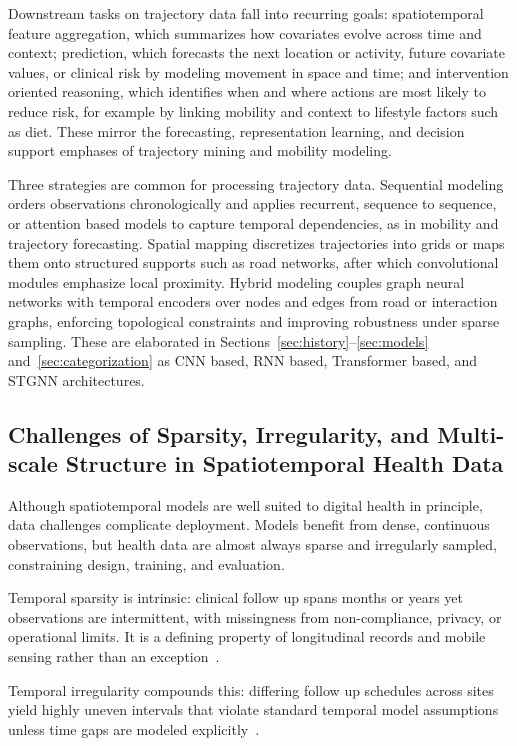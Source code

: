 \documentclass[journal]{IEEEtran}
\begin{document}
Downstream tasks on trajectory data fall into recurring goals: spatiotemporal feature aggregation, which summarizes how covariates evolve across time and context; prediction, which forecasts the next location or activity, future covariate values, or clinical risk by modeling movement in space and time; and intervention oriented reasoning, which identifies when and where actions are most likely to reduce risk, for example by linking mobility and context to lifestyle factors such as diet. These mirror the forecasting, representation learning, and decision support emphases of trajectory mining and mobility modeling.

Three strategies are common for processing trajectory data. Sequential modeling orders observations chronologically and applies recurrent, sequence to sequence, or attention based models to capture temporal dependencies, as in mobility and trajectory forecasting. Spatial mapping discretizes trajectories into grids or maps them onto structured supports such as road networks, after which convolutional modules emphasize local proximity. Hybrid modeling couples graph neural networks with temporal encoders over nodes and edges from road or interaction graphs, enforcing topological constraints and improving robustness under sparse sampling. These are elaborated in Sections~\ref{sec:history}--\ref{sec:models} and~\ref{sec:categorization} as CNN based, RNN based, Transformer based, and STGNN architectures.

\subsection{Challenges of Sparsity, Irregularity, and Multi-scale Structure in Spatiotemporal Health Data}
Although spatiotemporal models are well suited to digital health in principle, data challenges complicate deployment. Models benefit from dense, continuous observations, but health data are almost always sparse and irregularly sampled, constraining design, training, and evaluation.

Temporal sparsity is intrinsic: clinical follow up spans months or years yet observations are intermittent, with missingness from non-compliance, privacy, or operational limits. It is a defining property of longitudinal records and mobile sensing rather than an exception~\cite{che2018grud}.

Temporal irregularity compounds this: differing follow up schedules across sites yield highly uneven intervals that violate standard temporal model assumptions unless time gaps are modeled explicitly~\cite{shukla2021irregular}.
\end{document}
